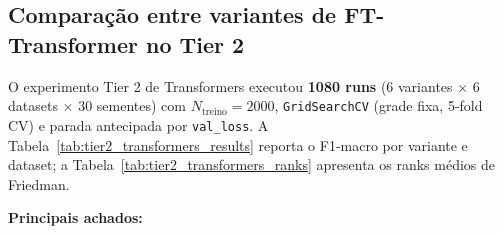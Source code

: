 \documentclass[12pt,a4paper]{article}
\begin{document}
\subsection{Comparação entre variantes de FT-Transformer no Tier 2}
\label{sec:tier2_transformer_variants}

O experimento Tier 2 de Transformers executou \textbf{1080 runs}
(6 variantes $\times$ 6 datasets $\times$ 30 sementes) com $N_{\text{treino}}=2000$,
\texttt{GridSearchCV} (grade fixa, 5-fold CV) e parada antecipada por \texttt{val\_loss}.
A Tabela~\ref{tab:tier2_transformers_results} reporta o F1-macro por variante e
dataset; a Tabela~\ref{tab:tier2_transformers_ranks} apresenta os ranks médios
de Friedman.





\textbf{Principais achados:}
\end{document}
